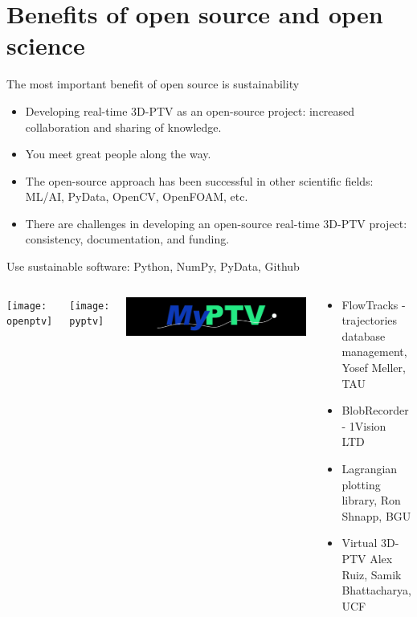 
\section{Benefits of open source and open science}

\begin{frame}[label=opensource-0]{The most important benefit of open source is sustainability}

\begin{card}
\begin{itemize}
\item Developing real-time 3D-PTV as an open-source project: increased collaboration and sharing of knowledge. 
\item You meet great people along the way.
\item The open-source approach has been successful in other scientific fields: ML/AI, PyData, OpenCV, OpenFOAM, etc.
\item There are challenges in developing an open-source real-time 3D-PTV project: consistency, documentation, and funding.
\end{itemize}
\end{card}
\end{frame}


\begin{frame}[label=opensource-1]{Use sustainable software: Python, NumPy, PyData, Github}
\begin{columns}
    \centering \texttt{[image: openptv]}
     
     \texttt{[image: pyptv]} 
     
     \includegraphics[width=.9\textwidth]{fig/myptv_logo.png}

\begin{card}
    \begin{itemize}
    \item FlowTracks - trajectories database management, Yosef Meller, TAU
    \item BlobRecorder - 1Vision LTD 
    \item Lagrangian plotting library, Ron Shnapp, BGU
    \item Virtual 3D-PTV Alex Ruiz, Samik Bhattacharya, UCF
    \end{itemize}
\end{card}
\end{columns}
\end{frame}



